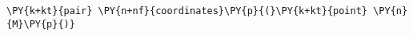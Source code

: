 \begin{Verbatim}[commandchars=\\\{\}]
    \PY{k+kt}{pair} \PY{n+nf}{coordinates}\PY{p}{(}\PY{k+kt}{point} \PY{n}{M}\PY{p}{)}
\end{Verbatim}

